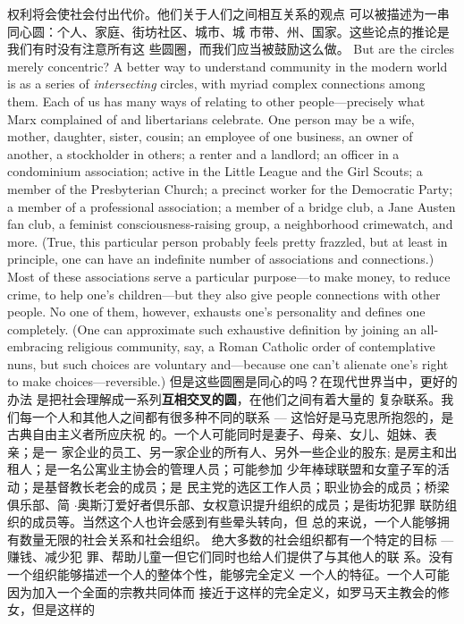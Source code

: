 \begin{paracol}{2}
权利将会使社会付出代价。他们关于人们之间相互关系的观点
可以被描述为一串同心圆：个人、家庭、街坊社区、城市、城
市带、州、国家。这些论点的推论是我们有时没有注意所有这
些圆圈，而我们应当被鼓励这么做。
\switchcolumn*
But are the circles merely concentric? A better way to understand community in the modern world is as a series of \textit{intersecting} circles, with myriad complex connections among them.
Each of us has many ways of relating to other people---precisely
what Marx complained of and libertarians celebrate. One person may be a wife, mother, daughter, sister, cousin; an employee of one business, an owner of another, a stockholder in
others; a renter and a landlord; an officer in a condominium association; active in the Little League and the Girl Scouts; a
member of the Presbyterian Church; a precinct worker for the
Democratic Party; a member of a professional association; a
member of a bridge club, a Jane Austen fan club, a feminist
consciousness-raising group, a neighborhood crimewatch, and
more. (True, this particular person probably feels pretty frazzled, but at least in principle, one can have an indefinite number of associations and connections.) Most of these associations
serve a particular purpose---to make money, to reduce crime, to
help one's children---but they also give people connections with
other people. No one of them, however, exhausts one's personality and defines one completely. (One can approximate such exhaustive definition by joining an all-embracing religious
community, say, a Roman Catholic order of contemplative
nuns, but such choices are voluntary and---because one can't
alienate one's right to make choices---reversible.)
\switchcolumn
但是这些圆圈是同心的吗？在现代世界当中，更好的办法
是把社会理解成一系列\textbf{互相交叉的圆}，在他们之间有着大量的
复杂联系。我们每一个人和其他人之间都有很多种不同的联系
--- 这恰好是马克思所抱怨的，是古典自由主义者所应庆祝
的。一个人可能同时是妻子、母亲、女儿、姐妹、表亲；是一
家企业的员工、另一家企业的所有人、另外一些企业的股东;
是房主和出租人；是一名公寓业主协会的管理人员；可能参加
少年棒球联盟和女童子军的活动；是基督教长老会的成员；是
民主党的选区工作人员；职业协会的成员；桥梁俱乐部、简 $\cdot$奥斯汀爱好者倶乐部、女权意识提升组织的成员；是街坊犯罪
联防组织的成员等。当然这个人也许会感到有些晕头转向，但
总的来说，一个人能够拥有数量无限的社会关系和社会组织。
绝大多数的社会组织都有一个特定的目标 --- 赚钱、减少犯
罪、帮助儿童一但它们同时也给人们提供了与其他人的联
系。没有一个组织能够描述一个人的整体个性，能够完全定义
一个人的特征。一个人可能因为加入一个全面的宗教共同体而
接近于这样的完全定义，如罗马天主教会的修女，但是这样的

\end{paracol}

